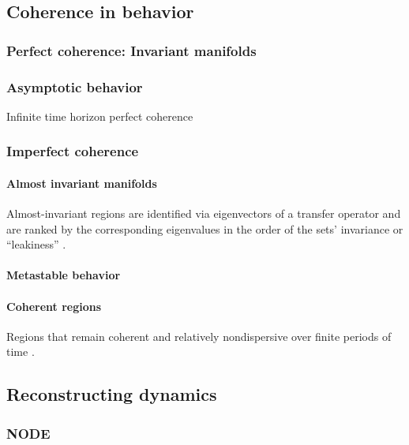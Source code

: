 \documentclass{article}
\theoremstyle{definition} \newtheorem{definition}{Definition}  \newtheorem{example}{Example}
\theoremstyle{remark} \newtheorem{remark}{Remark}
\newcounter{ct}
\begin{document}
\subsection{Coherence in behavior}
\subsubsection{Perfect coherence: Invariant manifolds}%


\subsubsection{Asymptotic behavior}\label{sec:asymptotic}
Infinite time horizon perfect coherence





\subsubsection{Imperfect coherence}%
\paragraph{Almost invariant manifolds}
 Almost-invariant regions are identified via eigenvectors of a transfer operator and are ranked by the corresponding eigenvalues in the order of the sets' invariance or ``leakiness'' \citep{froyland2009almost}.
    
    
    
\paragraph{Metastable behavior}\label{sec:metastable}
   \citep{brinkman2022metastable}
    
    
\paragraph{Coherent regions}
Regions that remain coherent and relatively nondispersive over finite periods of time \citep{fackeldey2019metastable}.



\subsection{Reconstructing dynamics}\label{sec:rec_dyn}
\subsubsection{NODE}
\citep{finlay2020trainnode}
\end{document}
